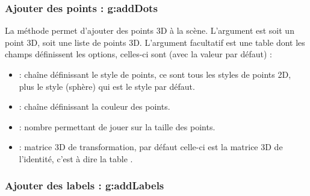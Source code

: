 \subsubsection{Ajouter des points : g:addDots}

La méthode  permet d'ajouter des points 3D à la scène. L'argument  est soit un point 3D, soit une liste de points 3D. L'argument facultatif  est une table dont les champs définissent les options, celles-ci sont (avec la valeur par défaut) :
\begin{itemize}
        \item {} : chaîne définissant le style de points, ce sont tous les styles de points 2D, plus le style  (sphère) qui est le style par défaut. 
    \item {} : chaîne définissant la couleur des points.
    \item {} : nombre permettant de jouer sur la taille des points.
    \item {} : matrice 3D de transformation, par défaut celle-ci est la matrice 3D de l'identité, c'est à dire la table .
\end{itemize}

\subsubsection{Ajouter des labels : g:addLabels}


